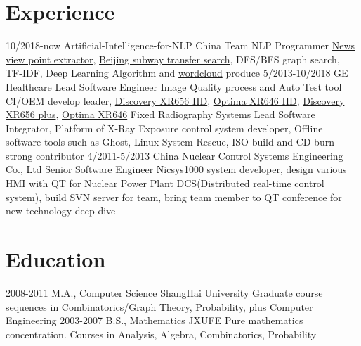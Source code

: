 \documentclass[letterpaper,10pt]{Resume_Liang}
\begin{document}
\begin{body}
\section{Experience}
\begin{entrylist}
  \entry
    {10/2018-now}
    {Artificial-Intelligence-for-NLP China Team}
    {NLP Programmer}
    {\href{https://github.com/wangliangster/TestWL/blob/master/ViewPointExtract.ipynb}{News view point extractor}, \href{https://github.com/wangliangster/NLP-Course/blob/master/BeijingSubway.ipynb}{Beijing subway transfer search}, DFS/BFS graph search, TF-IDF, Deep Learning Algorithm and \href{https://github.com/wangliangster/TestWL/blob/master/wordcloudLiang.ipynb}{wordcloud} produce }	
  \entry
    {5/2013-10/2018}
    {GE Healthcare}
    {Lead Software Engineer}
    {Image Quality process and Auto Test tool  CI/OEM develop leader, \href{https://www.gehealthcare.com/en/products/radiography/fixed-rad-systems/discovery-xr656-hd-x-ray-system-powered-by-helix}{Discovery XR656 HD}, \href{https://www.gehealthcare.com/en/products/radiography/fixed-rad-systems/optima-xr646-hd-x-ray-system-powered-by-helix}{Optima XR646 HD}, \href{https://www.gehealthcare.com/en/products/radiography/fixed-rad-systems/discovery-xr656-plus}{Discovery XR656 plus}, \href{https://www.gehealthcare.com/en/products/radiography/fixed-rad-systems/optima-xr646}{Optima XR646} Fixed Radiography Systems Lead Software Integrator, Platform of X-Ray Exposure control system developer, Offline software tools such as Ghost, Linux System-Rescue, ISO build and CD burn strong contributor}
  \entry
    {4/2011-5/2013}
    {China Nuclear Control Systems Engineering Co., Ltd}
    {Senior Software Engineer}
    {Nicsys1000 system developer, design various HMI with QT for Nuclear Power Plant DCS(Distributed real-time control system), build SVN server for team, bring team member to QT conference for new technology deep dive }
\end{entrylist}


\section{Education}
\begin{entrylist}
  \entry
    {2008-2011}
    {M.A., Computer Science}
    {ShangHai University}
    {Graduate course sequences in Combinatorics/Graph Theory, Probability, plus Computer Engineering }
  \entry
    {2003-2007}
    {B.S., Mathematics}
    {JXUFE}
    {Pure mathematics concentration. Courses in Analysis, Algebra, Combinatorics, Probability}
\end{entrylist}



\end{body}
\end{document}
